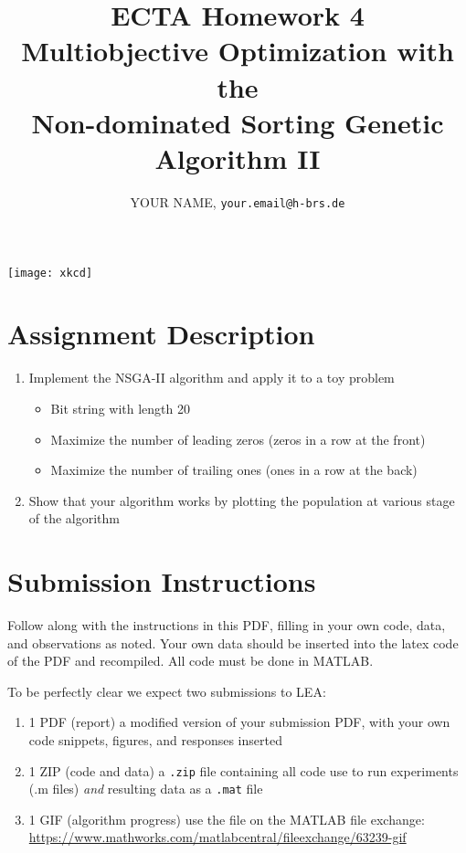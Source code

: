 \documentclass{article}
\title{ECTA Homework 4\\Multiobjective Optimization with the\\Non-dominated Sorting Genetic Algorithm II}
\author{\color{red}YOUR NAME, \texttt{your.email@h-brs.de}}
\begin{document}
\maketitle

\begin{center}
	\begin{minipage}{1\linewidth}
		\begin{center}
			\texttt{[image: xkcd]}
		\end{center}
	\end{minipage}
\end{center}

\newpage

\section{Assignment Description}
	\begin{enumerate}
		\item Implement the NSGA-II algorithm and apply it to a toy problem
			\begin{itemize}
			\item Bit string with length 20
			\item Maximize the number of leading zeros (zeros in a row at the front)
			\item Maximize the number of trailing ones (ones in a row at the back)
		\end{itemize}
		\item Show that your algorithm works by plotting the population at various stage of the algorithm
	\end{enumerate}

\section{Submission Instructions}
Follow along with the instructions in this PDF, filling in your own code, data, and observations as noted. Your own data should be inserted into the latex code of the PDF and recompiled. All code must be done in MATLAB.\@

To be perfectly clear we expect two submissions to LEA:\@
\begin{enumerate}
	\item 1 PDF (report) \- a modified version of your submission PDF, with your own code snippets, figures, and responses inserted
    \item 1 ZIP (code and data)   \- a \texttt{.zip} file containing all code use to run experiments (.m files) \textit{and} resulting data as a \texttt{.mat} file
	\item 1 GIF (algorithm progress) \- use the file on the MATLAB file exchange: \url{https://www.mathworks.com/matlabcentral/fileexchange/63239-gif}
\end{enumerate}
\end{document}
